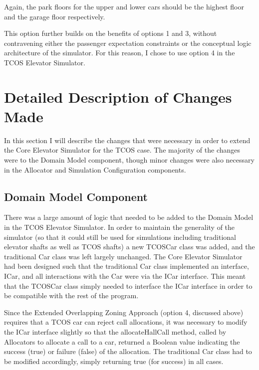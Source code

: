 \documentclass{UoYCSproject}
\begin{document}
Again, the park floors for the upper and lower cars should be the highest floor and the garage floor respectively.

This option further builds on the benefits of options 1 and 3, without contravening either the passenger expectation constraints or the conceptual logic architecture of the simulator.  For this reason, I chose to use option 4 in the TCOS Elevator Simulator.

\section{Detailed Description of Changes Made}

In this section I will describe the changes that were necessary in order to extend the Core Elevator Simulator for the TCOS case.  The majority of the changes were to the Domain Model component, though minor changes were also necessary in the Allocator and Simulation Configuration components.

\subsection{Domain Model Component}

There was a large amount of logic that needed to be added to the Domain Model in the TCOS Elevator Simulator.  In order to maintain the generality of the simulator (so that it could still be used for simulations including traditional elevator shafts as well as TCOS shafts) a new TCOSCar class was added, and the traditional Car class was left largely unchanged.  The Core Elevator Simulator had been designed such that the traditional Car class implemented an interface, ICar, and all interactions with the Car were via the ICar interface.  This meant that the TCOSCar class simply needed to interface the ICar interface in order to be compatible with the rest of the program.

Since the Extended Overlapping Zoning Approach (option 4, discussed above) requires that a TCOS car can reject call allocations, it was necessary to modify the ICar interface slightly so that the allocateHallCall method, called by Allocators to allocate a call to a car, returned a Boolean value indicating the success (true) or failure (false) of the allocation.  The traditional Car class had to be modified accordingly, simply returning true (for success) in all cases.
\end{document}
